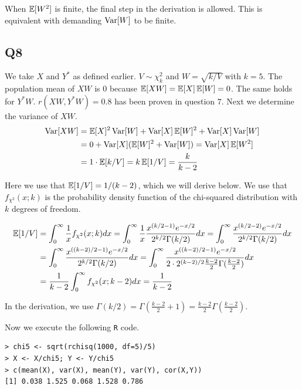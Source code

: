 When $\operatorname{\mathbb{E}}[W^2]$ is finite, the final step in the derivation is allowed. This is equivalent with demanding $\operatorname{\text{Var}}[W]$ to be finite.

\subsection*{Q8}

We take $X$ and $Y^*$ as defined earlier. $V \sim \chi^2_k$ and $W = \sqrt{k/V}$ with $k=5$.  The population mean of $XW$ is $0$ because $\operatorname{\mathbb{E}}[XW] = \operatorname{\mathbb{E}}[X]\operatorname{\mathbb{E}}[W] = 0$. The same holds for $Y^{*}W$. $r(XW,Y^{*}W) = 0.8$ has been proven in question $7$.
Next we determine the variance of $XW$.
\begin{align}
\operatorname{\text{Var}}[XW] & = \operatorname{\mathbb{E}}[X]^2 \operatorname{\text{Var}}[W] + \operatorname{\text{Var}}[X] \operatorname{\mathbb{E}}[W]^2 + \operatorname{\text{Var}}[X]\operatorname{\text{Var}}[W] \\
         & =  0 + \operatorname{\text{Var}}[X](\operatorname{\mathbb{E}}[W]^2 + \operatorname{\text{Var}}[W]) = \operatorname{\text{Var}}[X]\operatorname{\mathbb{E}}[W^2] \\
         & = 1 \cdot \operatorname{\mathbb{E}}[k/V] = k \operatorname{\mathbb{E}}[1/V] = \frac{k}{k-2}
\end{align}

Here we use that $\operatorname{\mathbb{E}}[1/V] = 1/(k-2)$, which we will derive below. We use that $f_{\chi^2}(x; k)$ is the probability density function of the chi-squared distribution with $k$ degrees of freedom.

\begin{align}
\operatorname{\mathbb{E}}[1/V] & = \int_{0}^{\infty} \frac{1}{x} f_{\chi^2}(x; k) dx = \int_{0}^{\infty} \frac{1}{x} \frac{x^{\left( k/2 - 1\right) }e^{-x/2}}{2^{k/2}\Gamma(k/2)} dx = \int_{0}^{\infty} \frac{x^{\left( k/2 - 2\right) }e^{-x/2}}{2^{k/2}\Gamma(k/2)} dx \\
        & = \int_{0}^{\infty} \frac{x^{\left(\left(k-2\right)/2 - 1\right) }e^{-x/2}}{2^{k/2}\Gamma(k/2)} dx = \int_{0}^{\infty} \frac{x^{\left(\left(k-2\right)/2 - 1\right) }e^{-x/2}}{2 \cdot 2^{\left(k-2\right)/2}\frac{k-2}{2} \Gamma(\frac{k-2}{2})} dx \\
        & = \frac{1}{k-2} \int_{0}^{\infty} f_{\chi^2}(x; k-2) dx = \frac{1}{k-2}
\end{align}

In the derivation, we use $\Gamma(k/2) = \Gamma(\frac{k-2}{2} + 1) = \frac{k-2}{2} \Gamma(\frac{k-2}{2})$.

Now we execute the following \verb|R| code.

\begin{verbatim}
> chi5 <- sqrt(rchisq(1000, df=5)/5)
> X <- X/chi5; Y <- Y/chi5 
> c(mean(X), var(X), mean(Y), var(Y), cor(X,Y))
[1] 0.038 1.525 0.068 1.528 0.786
\end{verbatim}

